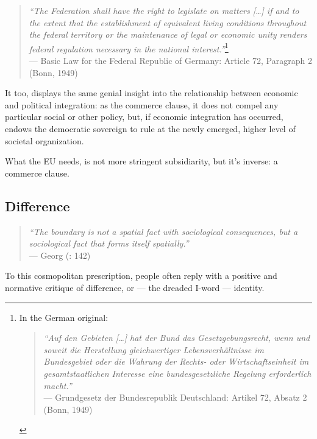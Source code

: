 \documentclass[11pt,a4paper,oneside,openright]{article}
\begin{document}
\begin{quote}
	\emph{``The Federation shall have the right to legislate on matters [\ldots] if and to the extent that the establishment of equivalent living conditions throughout the federal territory or the maintenance of legal or economic unity renders federal regulation necessary in the national interest.''}\footnote{
		In the German original:
			\begin{quote}
				\emph{``Auf den Gebieten [\ldots] hat der Bund das Gesetzgebungsrecht, wenn und soweit die Herstellung gleichwertiger Lebensverhältnisse im Bundesgebiet oder die Wahrung der Rechts- oder Wirtschaftseinheit im gesamtstaatlichen Interesse eine bundesgesetzliche Regelung erforderlich macht.''}\\
				--- Grundgesetz der Bundesrepublik Deutschland: Artikel 72, Absatz 2 (Bonn, 1949)
			\end{quote}}\\
	--- Basic Law for the Federal Republic of Germany: Article 72, Paragraph 2 (Bonn, 1949)
\end{quote}

It too, displays the same genial insight into the relationship between economic and political integration: as the commerce clause, it does not compel any particular social or other policy, but, if economic integration has occurred, endows the democratic sovereign to rule at the newly emerged, higher level of societal organization.


What the \gls{EU} needs, is not more stringent subsidiarity, but it's inverse: a commerce clause.

\subsection[Difference]{Difference} \label{sec:ID-Difference} 

\begin{quote}
	\emph{``The boundary is not a spatial fact with sociological consequences, but a sociological fact that forms itself spatially.''} \\
	--- Georg \citeauthor{Simmel1903} (\citeyear{Simmel1903}: 142)
\end{quote}

To this cosmopolitan prescription, people often reply with a positive and normative critique of difference, or --- the dreaded I-word --- identity. 
\end{document}
